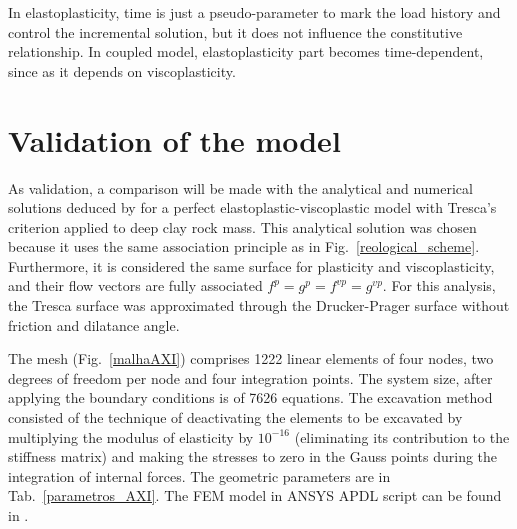 \documentclass[Journal,letterpaper]{ascelike-new}
\begin{document}
In elastoplasticity, time is just a pseudo-parameter to mark the load history and control the incremental solution, but it does not influence the constitutive relationship. In coupled model, elastoplasticity part becomes time-dependent, since as it depends on viscoplasticity.

\section{Validation of the model}

As validation, a comparison will be made with the analytical and numerical solutions deduced by \cite{piepi1995} for a perfect elastoplastic-viscoplastic model with Tresca’s criterion applied to deep clay rock mass. This analytical solution was chosen because it uses the same association principle as in Fig.~\ref{reological_scheme}. Furthermore, it is considered the same surface for plasticity and viscoplasticity, and their flow vectors are fully associated  $f^p = g^{p} = f^{vp} = g^{vp}$. For this analysis, the Tresca surface was approximated through the Drucker-Prager surface without friction and dilatance angle.

The mesh (Fig.~\ref{malhaAXI}) comprises 1222 linear elements of four nodes, two degrees of freedom per node and four integration points. The system size, after applying the boundary conditions is of 7626 equations. The excavation method consisted of the technique of deactivating the elements to be excavated by multiplying the modulus of elasticity by $10^{-16}$ (eliminating its contribution to the stiffness matrix) and making the stresses to zero in the Gauss points during the integration of internal forces. The geometric parameters are in Tab.~\ref{parametros_AXI}. The FEM model in ANSYS APDL script can be found in .
\end{document}
